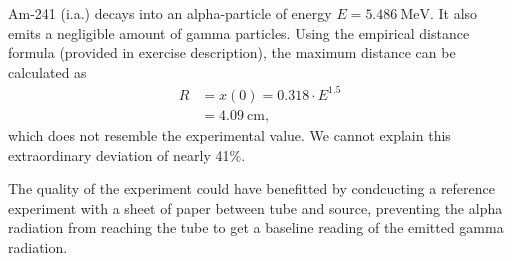 Am-241 (i.a.) decays into an alpha-particle of energy $E=\SI{5.486}{\mega\electronvolt}$.
It also emits a negligible amount of gamma particles.
Using the empirical distance formula (provided in exercise description), the maximum distance can be calculated as
\begin{align*}
	R &= x(0) = \num{0.318}\cdot E^{\num{1.5}} \\
	&=\SI{4.09}{\centi\meter},
\end{align*}
which does not resemble the experimental value.
We cannot explain this extraordinary deviation of nearly \num{41}\%.

The quality of the experiment could have benefitted by condcucting a reference experiment with a sheet of paper between tube and source, preventing the alpha radiation from reaching the tube to get a baseline reading of the emitted gamma radiation.
